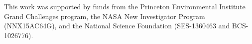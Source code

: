 \documentclass{pnastwo}
\begin{document}
\begin{article}
\begin{materials}



\end{materials}



\begin{acknowledgments}
This work was supported by funds from the Princeton Environmental Institute Grand Challenges program, the NASA New Investigator Program
(NNX15AC64G), and the National Science Foundation (SES-1360463 and BCS-1026776).
\end{acknowledgments}


 
{\footnotesize }

%


\end{article}
\end{document}
